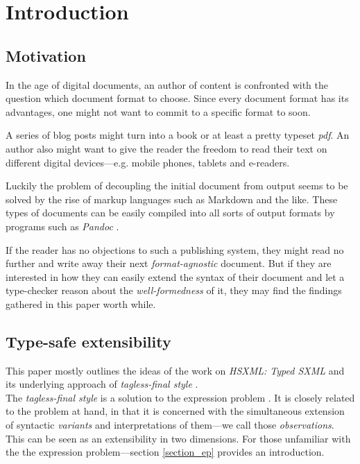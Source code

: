 \clearpage

\section{Introduction}

\subsection{Motivation}

In the age of digital documents, an author of content is confronted with the
question which document format to choose. Since every document format has its
advantages, one might not want to commit to a specific format to soon.

A series of blog posts might turn into a book or at least a pretty typeset
\emph{pdf}. An author also might want to give the reader the freedom to read
their text on different digital devices—e.g. mobile phones, tablets and
e-readers.

Luckily the problem of decoupling the initial document from output seems to be
solved by the rise of markup languages such as Markdown and the like. These
types of documents can be easily compiled into all sorts of output formats by
programs such as \emph{Pandoc} \cite{pandoc}.

If the reader has no objections to such a publishing system, they might read no
further and write away their next \emph{format-agnostic} document. But if they
are interested in how they can easily extend the syntax of their document and
let a type-checker reason about the \emph{well-formedness} of it, they may find
the findings gathered in this paper worth while.

\subsection{Type-safe extensibility}

This paper mostly outlines the ideas of the work on \emph{HSXML: Typed SXML}
\cite{hsxml} and its underlying approach of \emph{tagless-final style}
\cite{finally-tagless, finally-tagless-tut}.\\
The \emph{tagless-final style} is a solution to the expression problem
\cite{expression-problem}. It is closely related to the problem at hand, in that
it is concerned with the simultaneous extension of syntactic \emph{variants} and
interpretations of them—we call those \emph{observations}. This can be seen as
an extensibility in two dimensions. For those unfamiliar with the the expression
problem—section \ref{section_ep} provides an introduction.

